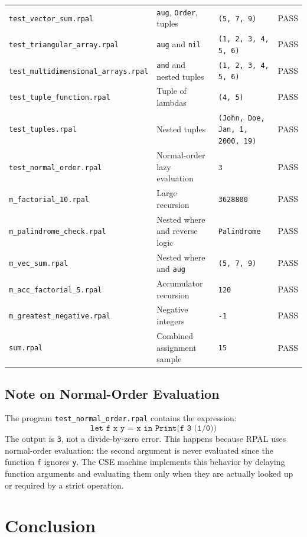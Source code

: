 \documentclass[12pt,a4paper]{article}
\begin{document}
\begin{table}[H]
\begin{tabular}{p{5.5cm}p{4.5cm}p{3.2cm}p{1.2cm}}
\texttt{test\_vector\_sum.rpal} & \texttt{aug}, \texttt{Order}, tuples & \texttt{(5, 7, 9)} & PASS \\
\texttt{test\_triangular\_array.rpal} & \texttt{aug} and \texttt{nil} & \texttt{(1, 2, 3, 4, 5, 6)} & PASS \\
\texttt{test\_multidimensional\_arrays.rpal} & \texttt{and} and nested tuples & \texttt{(1, 2, 3, 4, 5, 6)} & PASS \\
\texttt{test\_tuple\_function.rpal} & Tuple of lambdas & \texttt{(4, 5)} & PASS \\
\texttt{test\_tuples.rpal} & Nested tuples & \texttt{(John, Doe, Jan, 1, 2000, 19)} & PASS \\
\texttt{test\_normal\_order.rpal} & Normal-order lazy evaluation & \texttt{3} & PASS \\
\texttt{m\_factorial\_10.rpal} & Large recursion & \texttt{3628800} & PASS \\
\texttt{m\_palindrome\_check.rpal} & Nested where and reverse logic & \texttt{Palindrome} & PASS \\
\texttt{m\_vec\_sum.rpal} & Nested where and \texttt{aug} & \texttt{(5, 7, 9)} & PASS \\
\texttt{m\_acc\_factorial\_5.rpal} & Accumulator recursion & \texttt{120} & PASS \\
\texttt{m\_greatest\_negative.rpal} & Negative integers & \texttt{-1} & PASS \\
\texttt{sum.rpal} & Combined assignment sample & \texttt{15} & PASS \\
\bottomrule
\end{tabular}
\end{table}

\subsection{Note on Normal-Order Evaluation}

The program \texttt{test\_normal\_order.rpal} contains the expression:
\[
\texttt{let f x y = x in Print(f 3 (1/0))}
\]
The output is \texttt{3}, not a divide-by-zero error. This happens because RPAL uses normal-order evaluation: the second argument is never evaluated since the function \texttt{f} ignores \texttt{y}. The CSE machine implements this behavior by delaying function arguments and evaluating them only when they are actually looked up or required by a strict operation.

\section{Conclusion}
\end{document}
